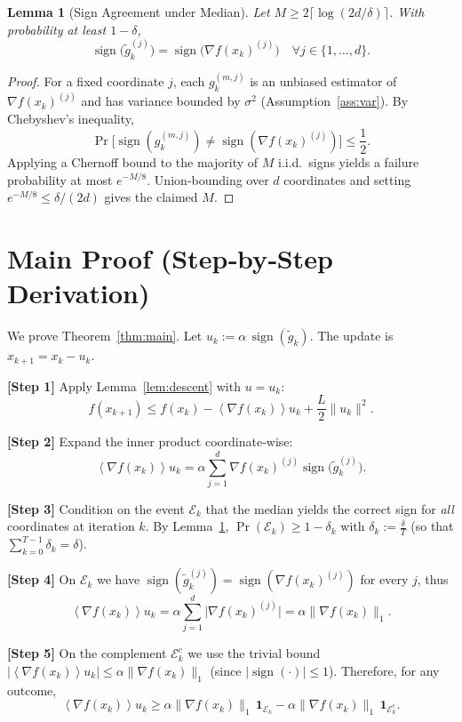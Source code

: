 \documentclass{article}
\newtheorem{lemma}{Lemma}
\newcommand{\sign}{\operatorname{sign}}
\newcommand{\inner}[1]{\left\langle#1\right\rangle}
\begin{document}
\begin{lemma}[Sign Agreement under Median]\label{lem:sign}
Let $M\ge 2\lceil\log (2d/\delta)\rceil$.  With probability at least $1-\delta$,
\[
\sign\!\bigl(\tilde{g}_k^{(j)}\bigr)=\sign\!\bigl(\nabla f(x_k)^{(j)}\bigr)
\quad\forall j\in\{1,\dots,d\}.
\]
\end{lemma}
\begin{proof}
For a fixed coordinate $j$, each $g_k^{(m,j)}$ is an unbiased estimator of $\nabla f(x_k)^{(j)}$ and has variance bounded by $\sigma^{2}$ (Assumption~\ref{ass:var}).  By Chebyshev’s inequality,
\[
\Pr\!\bigl[\sign(g_k^{(m,j)})\neq\sign(\nabla f(x_k)^{(j)})\bigr]\le \frac{1}{2}.
\]
Applying a Chernoff bound to the majority of $M$ i.i.d.\ signs yields a failure probability at most $e^{-M/8}$.  Union‑bounding over $d$ coordinates and setting $e^{-M/8}\le\delta/(2d)$ gives the claimed $M$.
\end{proof}

\section*{Main Proof (Step‑by‑Step Derivation)}
We prove Theorem~\ref{thm:main}.  Let $u_k:=\alpha\,\sign(\tilde{g}_k)$.  The update is $x_{k+1}=x_k-u_k$.

\noindent\textbf{[Step 1]} Apply Lemma~\ref{lem:descent} with $u=u_k$:
\[
f(x_{k+1})\le f(x_k)-\inner{\nabla f(x_k)}{u_k}+\frac{L}{2}\|u_k\|^{2}.
\tag{1}
\]

\noindent\textbf{[Step 2]} Expand the inner product coordinate‑wise:
\[
\inner{\nabla f(x_k)}{u_k}
=\alpha\sum_{j=1}^{d}\nabla f(x_k)^{(j)}\sign\!\bigl(\tilde{g}_k^{(j)}\bigr).
\tag{2}
\]

\noindent\textbf{[Step 3]} Condition on the event $\mathcal{E}_k$ that the median yields the correct sign for \emph{all} coordinates at iteration $k$.
By Lemma~\ref{lem:sign}, $\Pr(\mathcal{E}_k)\ge 1-\delta_k$ with $\delta_k:=\frac{\delta}{T}$ (so that $\sum_{k=0}^{T-1}\delta_k=\delta$).

\noindent\textbf{[Step 4]} On $\mathcal{E}_k$ we have $\sign(\tilde{g}_k^{(j)})=\sign(\nabla f(x_k)^{(j)})$ for every $j$, thus
\[
\inner{\nabla f(x_k)}{u_k}
= \alpha\sum_{j=1}^{d}\bigl|\nabla f(x_k)^{(j)}\bigr|
= \alpha\|\nabla f(x_k)\|_{1}.
\tag{3}
\]

\noindent\textbf{[Step 5]} On the complement $\mathcal{E}_k^{c}$ we use the trivial bound $|\inner{\nabla f(x_k)}{u_k}|\le \alpha\|\nabla f(x_k)\|_{1}$ (since $| \sign(\cdot) |\le1$).  Therefore, for any outcome,
\[
\inner{\nabla f(x_k)}{u_k}\ge \alpha\|\nabla f(x_k)\|_{1}\,\mathbf{1}_{\mathcal{E}_k}
- \alpha\|\nabla f(x_k)\|_{1}\,\mathbf{1}_{\mathcal{E}_k^{c}}.
\tag{4}
\]
\end{document}
